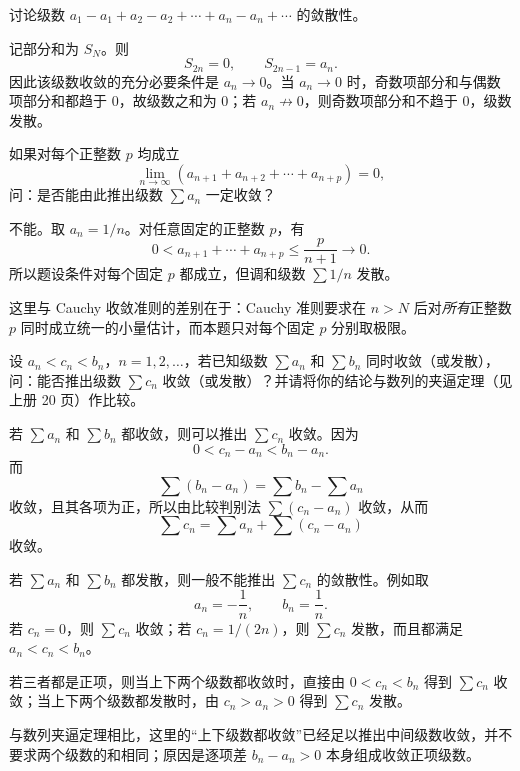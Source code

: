 \begin{xthought}[6]
讨论级数 $a_1-a_1+a_2-a_2+\cdots+a_n-a_n+\cdots$ 的敛散性。
\end{xthought}
\begin{xsolution}
记部分和为 $S_N$。则
\[
 S_{2n}=0,
 \qquad
 S_{2n-1}=a_n.
\]
因此该级数收敛的充分必要条件是 $a_n\to0$。当 $a_n\to0$ 时，奇数项部分和与偶数项部分和都趋于 $0$，故级数之和为 $0$；若 $a_n\not\to0$，则奇数项部分和不趋于 $0$，级数发散。
\end{xsolution}


\begin{xthought}[7]
如果对每个正整数 $p$ 均成立
\[
\lim_{n\to\infty}(a_{n+1}+a_{n+2}+\cdots+a_{n+p})=0,
\]
问：是否能由此推出级数 $\sum a_n$ 一定收敛？
\end{xthought}
\begin{xsolution}
不能。取 $a_n=1/n$。对任意固定的正整数 $p$，有
\[
 0<a_{n+1}+\cdots+a_{n+p}
 \leq \frac{p}{n+1}\longrightarrow0.
\]
所以题设条件对每个固定 $p$ 都成立，但调和级数 $\sum1/n$ 发散。

这里与 Cauchy 收敛准则的差别在于：Cauchy 准则要求在 $n>N$ 后对\emph{所有}正整数 $p$ 同时成立统一的小量估计，而本题只对每个固定 $p$ 分别取极限。
\end{xsolution}


\begin{xthought}[8]
设 $a_n<c_n<b_n$，$n=1,2,\ldots$，若已知级数 $\sum a_n$ 和 $\sum b_n$ 同时收敛（或发散），问：能否推出级数 $\sum c_n$ 收敛（或发散）？并请将你的结论与数列的夹逼定理（见上册 20 页）作比较。
\end{xthought}
\begin{xsolution}
若 $\sum a_n$ 和 $\sum b_n$ 都收敛，则可以推出 $\sum c_n$ 收敛。因为
\[
 0<c_n-a_n<b_n-a_n.
\]
而
\[
 \sum(b_n-a_n)=\sum b_n-\sum a_n
\]
收敛，且其各项为正，所以由比较判别法 $\sum(c_n-a_n)$ 收敛，从而
\[
 \sum c_n=\sum a_n+\sum(c_n-a_n)
\]
收敛。

若 $\sum a_n$ 和 $\sum b_n$ 都发散，则一般不能推出 $\sum c_n$ 的敛散性。例如取
\[
 a_n=-\frac1n,\qquad b_n=\frac1n.
\]
若 $c_n=0$，则 $\sum c_n$ 收敛；若 $c_n=1/(2n)$，则 $\sum c_n$ 发散，而且都满足 $a_n<c_n<b_n$。

若三者都是正项，则当上下两个级数都收敛时，直接由 $0<c_n<b_n$ 得到 $\sum c_n$ 收敛；当上下两个级数都发散时，由 $c_n>a_n>0$ 得到 $\sum c_n$ 发散。

与数列夹逼定理相比，这里的“上下级数都收敛”已经足以推出中间级数收敛，并不要求两个级数的和相同；原因是逐项差 $b_n-a_n>0$ 本身组成收敛正项级数。
\end{xsolution}


